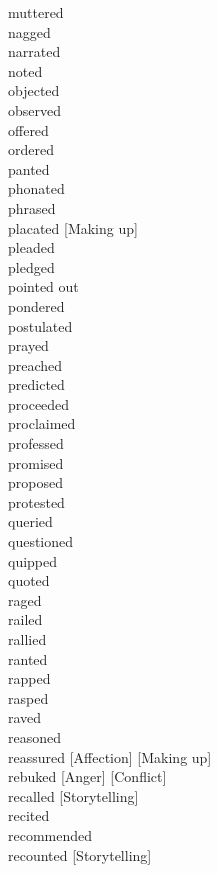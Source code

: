\documentclass[a4paper,12pt,fleqn]{book}\usepackage{cooltooltips}\usepackage{polyglossia}\setdefaultlanguage[babelshorthands=true]{russian}\setotherlanguage{english}\defaultfontfeatures{Ligatures=TeX,Mapping=tex-text} \usepackage{xcolor}\definecolor{lightgray}{HTML}{bbbbbb}\color{lightgray}\newcommand{\ml}[3]{\textenglish{\textcolor{black}{#3}}}
\begin{document}
{muttered \hfill \\
nagged \hfill \\
narrated \hfill \\
noted \hfill \\
objected \hfill \\
observed \hfill \\
offered \hfill \\
ordered \hfill \\
panted \hfill \\
phonated \hfill \\
phrased \hfill \\
placated [Making up] \hfill \\
pleaded \hfill \\
pledged \hfill \\
pointed out \hfill \\
pondered \hfill \\
postulated \hfill \\
prayed \hfill \\
preached \hfill \\
predicted \hfill \\
proceeded \hfill \\
proclaimed \hfill \\
professed \hfill \\
promised \hfill \\
proposed \hfill \\
protested \hfill \\
queried \hfill \\
questioned \hfill \\
quipped \hfill \\
quoted \hfill \\
raged \hfill \\
railed \hfill \\
rallied \hfill \\
ranted \hfill \\
rapped \hfill \\
rasped \hfill \\
raved \hfill \\
reasoned \hfill \\
reassured [Affection] [Making up] \hfill \\
rebuked [Anger] [Conflict] \hfill \\
recalled [Storytelling] \hfill \\
recited \hfill \\
recommended \hfill \\
recounted [Storytelling] \hfill \\
}
\end{document}
